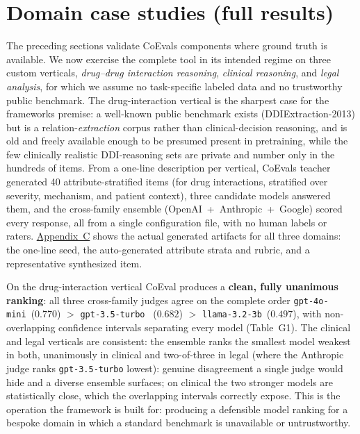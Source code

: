 \documentclass[11pt,a4paper]{article}
\begin{document}
\section{Domain case studies (full results)}\label{appG}

The preceding sections validate CoEval\textquotesingle s components where ground truth is available. We now exercise the complete tool
in its intended regime on three custom verticals, \emph{drug--drug interaction reasoning}, \emph{clinical
reasoning}, and \emph{legal analysis}, for which we assume no task-specific labeled data and no trustworthy
public benchmark. The drug-interaction vertical is the sharpest case for the framework\textquotesingle s premise: a well-known public
benchmark exists (DDIExtraction-2013) but is a relation-\emph{extraction} corpus rather than clinical-decision
reasoning, and is old and freely available enough to be presumed present in pretraining, while the few clinically
realistic DDI-reasoning sets are private and number only in the hundreds of items. From a one-line description per
vertical, CoEval\textquotesingle s teacher generated 40 attribute-stratified items (for drug interactions, stratified over severity,
mechanism, and patient context), three candidate models answered them, and the cross-family ensemble
(OpenAI~+~Anthropic~+~Google) scored every response, all from a single configuration file, with
no human labels or raters. \hyperref[appC]{Appendix~C} shows the actual generated artifacts for all three
domains: the one-line seed, the auto-generated attribute strata and rubric, and a representative synthesized item.

On the drug-interaction vertical CoEval produces a \textbf{clean, fully unanimous ranking}: all three
cross-family judges agree on the complete order \texttt{gpt-4o-mini}~(\(0.770\)) \(>\) \texttt{gpt-3.5-turbo}
~(\(0.682\)) \(>\) \texttt{llama-3.2-3b}~(\(0.497\)), with non-overlapping confidence intervals separating every
model (Table~G1). The clinical and legal verticals are consistent: the ensemble ranks the smallest model weakest in
both, unanimously in clinical and two-of-three in legal (where the Anthropic judge ranks \texttt{gpt-3.5-turbo}
lowest): genuine disagreement a single judge would hide and a diverse ensemble surfaces; on clinical the two
stronger models are statistically close, which the overlapping intervals correctly expose. This is the operation the
framework is built for: producing a defensible model ranking for a bespoke domain in which a standard benchmark is
unavailable or untrustworthy.
\end{document}
